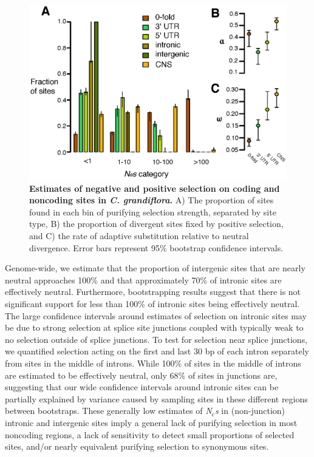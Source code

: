 \begin{figure}[ht!]
      \centering
       \includegraphics[scale=0.8]{Ch2Fig1}
    \caption{\textbf{Estimates of negative and positive selection on coding and noncoding sites in \textit{C. grandiflora}.} A) The proportion of sites found in each bin of purifying selection strength, separated by site type, B) the proportion of divergent sites fixed by positive selection, and C) the rate of adaptive substitution relative to neutral divergence. Error bars represent 95\% bootstrap confidence intervals.}
    \label{fig:fig1}
\end{figure}

Genome-wide, we estimate that the proportion of intergenic sites that are nearly neutral approaches 100\% and that approximately 70\% of intronic sites are effectively neutral. Furthermore, bootstrapping results suggest that there is not significant support for less than 100\% of intronic sites being effectively neutral. The large confidence intervals around estimates of selection on intronic sites may be due to strong selection at splice site junctions \citep{Haudry2013-qe} coupled with typically weak to no selection outside of splice junctions. To test for selection near splice junctions, we quantified selection acting on the first and last 30 bp of each intron separately from sites in the middle of introns. While 100\% of sites in the middle of introns are estimated to be effectively neutral, only 68\% of sites in junctions are, suggesting that our wide confidence intervals around intronic sites can be partially explained by variance caused by sampling sites in these different regions between bootstraps. These generally low estimates of \textit{N$_{e}$s} in (non-junction) intronic and intergenic sites imply a general lack of purifying selection in most noncoding regions, a lack of sensitivity to detect small proportions of selected sites, and/or nearly equivalent purifying selection to synonymous sites. 

